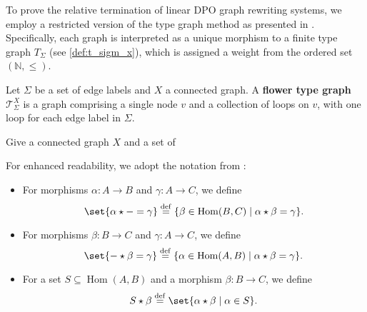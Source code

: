 To prove the relative termination of linear DPO graph rewriting systems, we employ a restricted version of the type graph method as presented in \cite{endrullis2023generalized}. Specifically, each graph is interpreted as a unique morphism to a finite type graph \( T_\Sigma \) (see \autoref{def:t_sigm_x}), which is assigned a weight from the ordered set \((\mathbb{N}, \leq)\).

\begin{definition}
    \label{def:t_sigm_x}
    Let $\Sigma$ be a set of edge labels and \( X \) a connected graph.
    A \textbf{flower type graph} \( \mathcal{T}_\Sigma^X \) is a graph comprising a single node \( v \) and a collection of loops on \( v \), with one loop for each edge label in \( \Sigma \).
\end{definition}
Give a connected graph $X$ and a set of 

\begin{remark}[Notation]
    For enhanced readability, we adopt the notation from \cite[Notation 3.3]{endrullis2023generalized}:
    \begin{itemize}
        \item For morphisms \( \alpha : A \to B \) and \( \gamma : A \to C \), we define
        \[
            \set{ \alpha \star - = \gamma } \overset{\operatorname{def}}{=} \{ \beta \in \operatorname{Hom}(B, C) \mid \alpha \star \beta = \gamma \}.
        \]
        \item For morphisms \( \beta : B \to C \) and \( \gamma : A \to C \), we define
        \[
            \set{ - \star \beta = \gamma } \overset{\operatorname{def}}{=} \{ \alpha \in \operatorname{Hom}(A, B) \mid \alpha \star \beta = \gamma \}.
        \]
        \item For a set \( S \subseteq \operatorname{Hom}(A, B) \) and a morphism \( \beta : B \to C \), we define
        \[
            S \star \beta \overset{\operatorname{def}}{=} \set{ \alpha \star \beta \mid \alpha \in S }.
        \]
    \end{itemize}
\end{remark}

